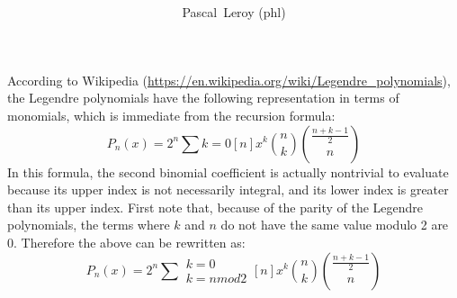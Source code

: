 \documentclass[10pt, a4paper, oneside]{basestyle}
\title{%
\textdisplay{%
Explicit representation of Legendre polynomials%
}%
}
\author{Pascal~Leroy (phl)}
\begin{document}
\maketitle
\noindent
According to Wikipedia (\url{https://en.wikipedia.org/wiki/Legendre_polynomials}), the Legendre polynomials have the following representation in terms of monomials, which is immediate from the recursion formula:
\begin{equation*}
P_n(x) = 2^n \sum{k = 0}[n] x^k \binom{n}{k} \binom{\frac{n + k - 1}{2}}{n}
\end{equation*}
In this formula, the second binomial coefficient is actually nontrivial to evaluate because its upper index is not necessarily integral, and its lower index is greater than its upper index.
First note that, because of the parity of the Legendre polynomials, the terms where $k$ and $n$ do not have the same value modulo 2 are 0.  Therefore the above can be rewritten as:
\begin{equation*}
P_n(x) = 2^n \sum{\substack{k = 0\\ k = n mod 2}}[n] x^k \binom{n}{k} \binom{\frac{n + k - 1}{2}}{n}
\end{equation*}
\end{document}
